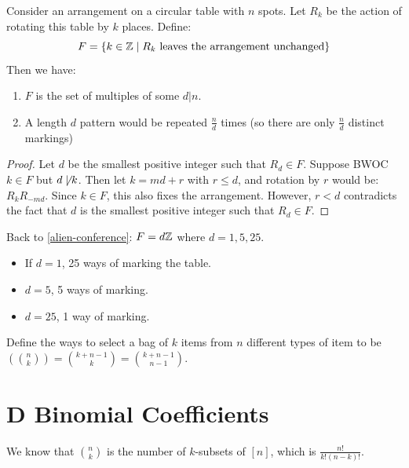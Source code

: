 \documentclass[12pt]{article}
\begin{document}
\begin{theorem}
    Consider an arrangement on a circular table with $n$ spots. Let $R_k$ be the action of rotating this table by $k$ places. Define: \[F=\{k\in \mathbb{Z}\mid R_k\text{ leaves the arrangement unchanged}\}\]
    Then we have: \begin{enumerate}
        \item $F$ is the set of multiples of some $d|n$.
        \item A length $d$ pattern would be repeated $\frac{n}{d}$ times (so there are only $\frac{n}{d}$ distinct markings)
    \end{enumerate}
\end{theorem}
\begin{proof}
    Let $d$ be the smallest positive integer such that $R_d\in F$. 
    Suppose BWOC $k\in F$ but $d\not\mid k$. Then let $k=md+r$ with $r\leq d$, and rotation by $r$ would be: $R_kR_{-md}$. Since $k\in F$, this also fixes the arrangement. However, $r<d$ contradicts the fact that $d$ is the smallest positive integer such that $R_d\in F$. 
\end{proof}

Back to \cref{alien-conference}: \(F=d\mathbb{Z}\) where $d=1,5,25$.
\begin{itemize}
    \item If $d=1$, 25 ways of marking the table.
    \item $d=5$, 5 ways of marking.
    \item $d=25$, 1 way of marking.
\end{itemize}

 Define the ways to select a bag of $k$ items from $n$ different types of item to be $\left({n\choose k}\right) = {k+n-1\choose k}= {k+n-1\choose n-1}$.

\section{D Binomial Coefficients}
We know that $n\choose k$ is the number of $k$-subsets of $[n]$, which is $\frac{n!}{k!(n-k)!}$.
\end{document}
